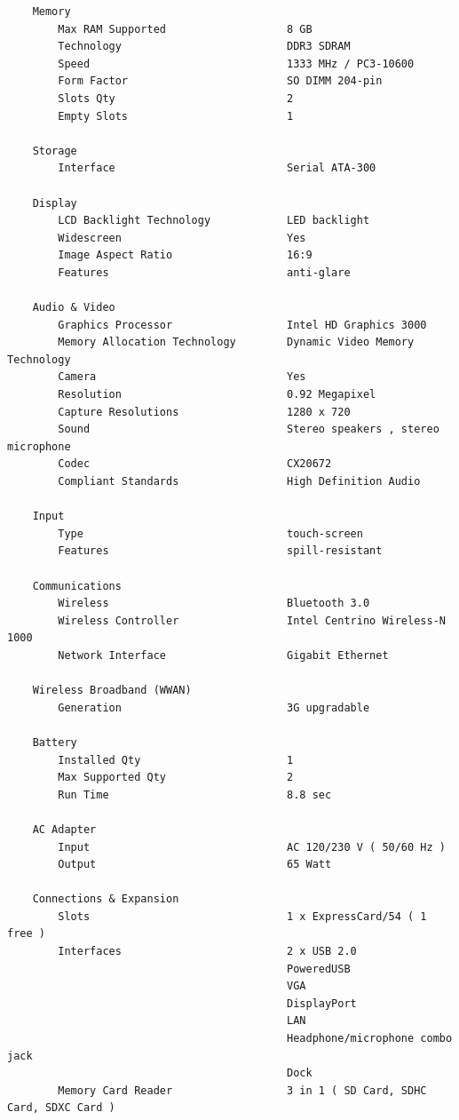 \documentclass[11pt]{book}
\begin{document}
\begin{tiny}
\begin{verbatim}
    Memory
        Max RAM Supported                   8 GB
        Technology                          DDR3 SDRAM
        Speed                               1333 MHz / PC3-10600
        Form Factor                         SO DIMM 204-pin
        Slots Qty                           2
        Empty Slots                         1

    Storage
        Interface                           Serial ATA-300

    Display
        LCD Backlight Technology            LED backlight
        Widescreen                          Yes
        Image Aspect Ratio                  16:9
        Features                            anti-glare

    Audio & Video
        Graphics Processor                  Intel HD Graphics 3000
        Memory Allocation Technology        Dynamic Video Memory Technology
        Camera                              Yes
        Resolution                          0.92 Megapixel
        Capture Resolutions                 1280 x 720
        Sound                               Stereo speakers , stereo microphone
        Codec                               CX20672
        Compliant Standards                 High Definition Audio

    Input
        Type                                touch-screen
        Features                            spill-resistant

    Communications
        Wireless                            Bluetooth 3.0
        Wireless Controller                 Intel Centrino Wireless-N 1000
        Network Interface                   Gigabit Ethernet

    Wireless Broadband (WWAN)
        Generation                          3G upgradable

    Battery
        Installed Qty                       1
        Max Supported Qty                   2
        Run Time                            8.8 sec

    AC Adapter
        Input                               AC 120/230 V ( 50/60 Hz )
        Output                              65 Watt

    Connections & Expansion
        Slots                               1 x ExpressCard/54 ( 1 free )
        Interfaces                          2 x USB 2.0
                                            PoweredUSB
                                            VGA
                                            DisplayPort
                                            LAN
                                            Headphone/microphone combo jack
                                            Dock
        Memory Card Reader                  3 in 1 ( SD Card, SDHC Card, SDXC Card )


\end{verbatim}
\end{tiny}
\end{document}
